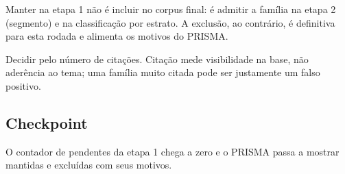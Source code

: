 \begin{nota}
Manter na etapa 1 não é incluir no corpus final: é admitir a família na etapa 2 (segmento) e na
classificação por estrato. A exclusão, ao contrário, é definitiva para esta rodada e alimenta os
motivos do PRISMA.
\end{nota}

\begin{alerta}
Decidir pelo número de citações. Citação mede visibilidade na base, não aderência ao tema; uma família
muito citada pode ser justamente um falso positivo.
\end{alerta}

\subsection*{Checkpoint}
\marcador\; O contador de pendentes da etapa 1 chega a zero e o PRISMA passa a mostrar mantidas e
excluídas com seus motivos.

